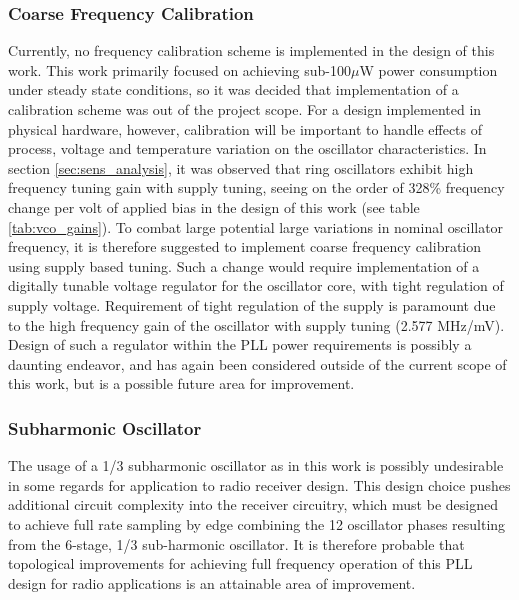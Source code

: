 	\subsubsection{Coarse Frequency Calibration}
	Currently, no frequency calibration scheme is implemented in the design of this work. This work primarily focused on achieving sub-100$\mu$W power consumption under steady state conditions, so it was decided that implementation of a calibration scheme was out of the project scope. For a design implemented in physical hardware, however, calibration will be important to handle effects of process, voltage and temperature variation on the oscillator characteristics. In section \ref{sec:sens_analysis}, it was observed that ring oscillators exhibit high frequency tuning gain with supply tuning, seeing on the order of 328\% frequency change per volt of applied bias in the design of this work (see table \ref{tab:vco_gains}). To combat large potential large variations in nominal oscillator frequency, it is therefore suggested to implement coarse frequency calibration using supply based tuning. Such a change would require implementation of a digitally tunable voltage regulator for the oscillator core, with tight regulation of supply voltage. Requirement of tight regulation of the supply is paramount due to the high frequency gain of the oscillator with supply tuning (2.577 MHz/mV). Design of such a regulator within the PLL power requirements is possibly a daunting endeavor, and has again been considered outside of the current scope of this work, but is a possible future area for improvement.


	\subsubsection{Subharmonic Oscillator}
		The usage of a 1/3 subharmonic oscillator as in this work is possibly undesirable in some regards for application to radio receiver design. This design choice pushes additional circuit complexity into the receiver circuitry, which must be designed to achieve full rate sampling by edge combining the 12 oscillator phases resulting from the 6-stage, 1/3 sub-harmonic oscillator. It is therefore probable that topological improvements for achieving full frequency operation of this PLL design for radio applications is an attainable area of improvement. 

